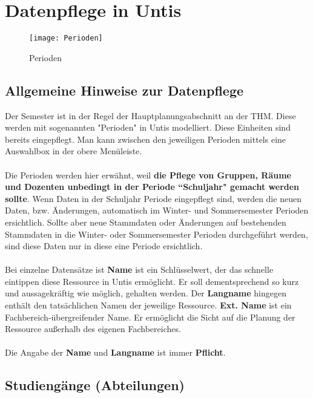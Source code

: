 
\chapter{Datenpflege in Untis}

\begin{wrapfigure}{r}{0.4\textwidth}
	\vspace{-15pt}
	\texttt{[image: Perioden]}
	\vspace{-15pt}
	\caption{Perioden}
	\label{fig:mf-sg}
\end{wrapfigure}

\section{Allgemeine Hinweise zur Datenpflege}
Der Semester ist in der Regel der Hauptplanungsabschnitt an der THM. Diese werden mit sogenannten "Perioden" in Untis modelliert. Diese Einheiten sind bereits eingepflegt. Man kann zwischen den jeweiligen Perioden mittels eine Auswahlbox in der obere Menüleiste.\\
\\
Die Perioden werden hier erwähnt, weil \textbf{die Pflege von Gruppen, Räume und Dozenten unbedingt in der Periode ``Schuljahr" gemacht werden sollte}. Wenn Daten in der Schuljahr Periode eingepflegt sind, werden die neuen Daten, bzw. Änderungen, automatisch im Winter- und Sommersemester Perioden ersichtlich. Sollte aber neue Stammdaten oder Änderungen auf bestehenden Stammdaten in die Winter- oder Sommersemester Perioden durchgeführt werden, sind diese Daten nur in diese eine Periode ersichtlich.\\
\\
Bei einzelne Datensätze ist \textbf{Name} ist ein Schlüsselwert, der das schnelle eintippen diese Ressource in Untis ermöglicht. Er soll dementsprechend so kurz und aussagekräftig wie möglich, gehalten werden. Der \textbf{Langname} hingegen enthält den tatsächlichen Namen der jeweilige Ressource. \textbf{Ext. Name} ist ein Fachbereich-übergreifender Name. Er ermöglicht die Sicht auf die Planung der Ressource außerhalb des eigenen Fachbereiches.\\
\\
Die Angabe der \textbf{Name} und \textbf{Langname} ist immer \textbf{Pflicht}.

\newpage
\section{Studiengänge (Abteilungen)}

